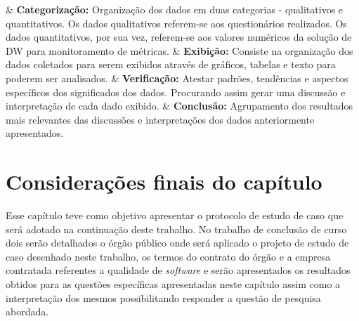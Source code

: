 \begin{easylist}[itemize]	
	
	& \textbf{Categorização: } Organização dos dados em duas categorias - qualitativos e quantitativos. Os dados qualitativos referem-se aos questionários realizados. Os dados quantitativos, por sua vez, referem-se aos valores numéricos da solução de DW para monitoramento de métricas. 
	& \textbf{Exibição: } Consiste na organização dos dados coletados para serem exibidos através de gráficos, tabelas e texto para poderem ser analisados. 
	& \textbf{Verificação: } Atestar padrões, tendências e aspectos específicos dos significados dos dados. Procurando assim gerar uma discussão e interpretação de cada dado exibido.
	& \textbf{Conclusão: } Agrupamento dos resultados mais relevantes das discussões e interpretações dos dados anteriormente apresentados.
	
	\end{easylist}	


\section{Considerações finais do capítulo}

Esse capítulo teve como objetivo apresentar o protocolo de estudo de caso que será adotado na continuação deste trabalho. No trabalho de conclusão de curso dois serão detalhados o órgão público onde será aplicado o projeto de estudo de caso desenhado neste trabalho, os termos do contrato do órgão e a empresa contratada referentes a qualidade de \textit{software} e serão apresentados os resultados obtidos para as questões específicas apresentadas neste capítulo assim como a interpretação dos mesmos possibilitando responder a questão de pesquisa abordada.  